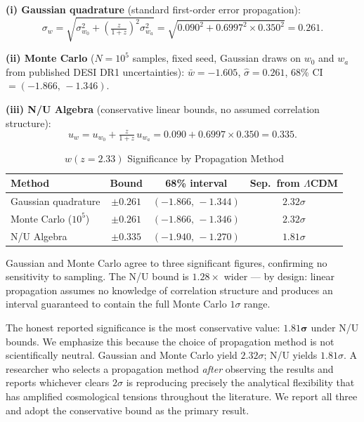 \documentclass[twocolumn]{aastex631}
\begin{document}
\noindent\textbf{(i) Gaussian quadrature} (standard first-order error propagation):
\begin{equation}
  \sigma_w = \sqrt{\sigma_{w_0}^2 + \left(\tfrac{z}{1+z}\right)^2 \sigma_{w_a}^2}
           = \sqrt{0.090^2 + 0.6997^2 \times 0.350^2} = 0.261.
\end{equation}

\noindent\textbf{(ii) Monte Carlo} ($N = 10^5$ samples, fixed seed, Gaussian draws
on $w_0$ and $w_a$ from published DESI DR1 uncertainties):
$\bar{w} = -1.605$, $\hat{\sigma} = 0.261$, 68\% CI $= (-1.866,\,-1.346)$.

\noindent\textbf{(iii) N/U Algebra} \citep{Martin2026a} (conservative linear
bounds, no assumed correlation structure):
\begin{equation}
  u_w = u_{w_0} + \tfrac{z}{1+z}\,u_{w_a}
      = 0.090 + 0.6997\times 0.350 = 0.335.
\end{equation}

\begin{table}[h]
\centering
\caption{$w(z=2.33)$ Significance by Propagation Method}
\label{tab:propagation}
\begin{tabular}{lccc}
\toprule
Method & Bound & 68\% interval & Sep.\ from $\Lambda$CDM \\
\midrule
Gaussian quadrature  & $\pm 0.261$ & $(-1.866,\,-1.344)$ & $2.32\sigma$ \\
Monte Carlo ($10^5$) & $\pm 0.261$ & $(-1.866,\,-1.346)$ & $2.32\sigma$ \\
N/U Algebra          & $\pm 0.335$ & $(-1.940,\,-1.270)$ & $1.81\sigma$ \\
\bottomrule
\end{tabular}
\end{table}

Gaussian and Monte Carlo agree to three significant figures, confirming
no sensitivity to sampling.
The N/U bound is $1.28\times$ wider --- by design: linear propagation assumes
no knowledge of correlation structure and produces an interval guaranteed
to contain the full Monte Carlo $1\sigma$ range.

The honest reported significance is the most conservative value: $\mathbf{1.81\sigma}$
under N/U bounds.
We emphasize this because the choice of propagation method is not scientifically
neutral.
Gaussian and Monte Carlo yield $2.32\sigma$; N/U yields $1.81\sigma$.
A researcher who selects a propagation method \emph{after} observing the
results and reports whichever clears $2\sigma$ is reproducing precisely
the analytical flexibility that has amplified cosmological tensions throughout
the literature.
We report all three and adopt the conservative bound as the primary result.
\end{document}
